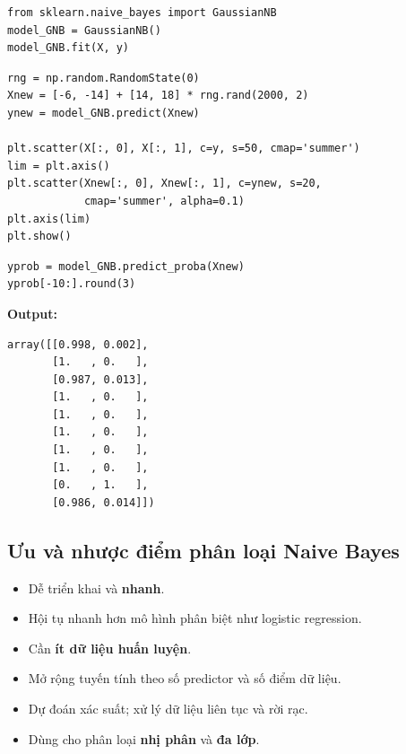 \begin{vidu}[title={Huấn luyện GaussianNB}]
\begin{lstlisting}
from sklearn.naive_bayes import GaussianNB
model_GNB = GaussianNB()
model_GNB.fit(X, y)
\end{lstlisting}
\end{vidu}

\begin{vidu}[title={Dự đoán trên dữ liệu mới}]
\begin{lstlisting}
rng = np.random.RandomState(0)
Xnew = [-6, -14] + [14, 18] * rng.rand(2000, 2)
ynew = model_GNB.predict(Xnew)

plt.scatter(X[:, 0], X[:, 1], c=y, s=50, cmap='summer')
lim = plt.axis()
plt.scatter(Xnew[:, 0], Xnew[:, 1], c=ynew, s=20,
            cmap='summer', alpha=0.1)
plt.axis(lim)
plt.show()
\end{lstlisting}

\end{vidu}

\begin{vidu}[title={Xác suất hậu nghiệm}]
\begin{lstlisting}
yprob = model_GNB.predict_proba(Xnew)
yprob[-10:].round(3)
\end{lstlisting}

\textbf{Output:}
\begin{verbatim}
array([[0.998, 0.002],
       [1.   , 0.   ],
       [0.987, 0.013],
       [1.   , 0.   ],
       [1.   , 0.   ],
       [1.   , 0.   ],
       [1.   , 0.   ],
       [1.   , 0.   ],
       [0.   , 1.   ],
       [0.986, 0.014]])
\end{verbatim}
\end{vidu}

\subsection{Ưu và nhược điểm phân loại Naive Bayes}

\begin{tinhchat}[title={Ưu điểm (Pros)}]
\begin{itemize}
  \item Dễ triển khai và \textbf{nhanh}.
  \item Hội tụ nhanh hơn mô hình phân biệt như logistic regression.
  \item Cần \textbf{ít dữ liệu huấn luyện}.
  \item Mở rộng tuyến tính theo số predictor và số điểm dữ liệu.
  \item Dự đoán xác suất; xử lý dữ liệu liên tục và rời rạc.
  \item Dùng cho phân loại \textbf{nhị phân} và \textbf{đa lớp}.
\end{itemize}
\end{tinhchat}

